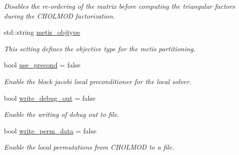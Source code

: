 \begin{DoxyCompactItemize}
\begin{DoxyCompactList}\small\item\em Disables the re-\/ordering of the matrix before computing the triangular factors during the C\+H\+O\+L\+M\+OD factorization. \end{DoxyCompactList}\item 
\mbox{\label{structSchwarzWrappers_1_1Settings_abbfee6b651293973f478e70ae656d6d0}} 
std\+::string \hyperlink{structSchwarzWrappers_1_1Settings_abbfee6b651293973f478e70ae656d6d0}{metis\+\_\+objtype}
\begin{DoxyCompactList}\small\item\em This setting defines the objective type for the metis partitioning. \end{DoxyCompactList}\item 
\mbox{\label{structSchwarzWrappers_1_1Settings_a91f3a3c6eb903baace2d424285777cb8}} 
bool \hyperlink{structSchwarzWrappers_1_1Settings_a91f3a3c6eb903baace2d424285777cb8}{use\+\_\+precond} = false
\begin{DoxyCompactList}\small\item\em Enable the block jacobi local preconditioner for the local solver. \end{DoxyCompactList}\item 
\mbox{\label{structSchwarzWrappers_1_1Settings_a22d2c317d86d5388178b5003bcc52b98}} 
bool \hyperlink{structSchwarzWrappers_1_1Settings_a22d2c317d86d5388178b5003bcc52b98}{write\+\_\+debug\+\_\+out} = false
\begin{DoxyCompactList}\small\item\em Enable the writing of debug out to file. \end{DoxyCompactList}\item 
\mbox{\label{structSchwarzWrappers_1_1Settings_a04ee69460b8c946710ef15af70f086b4}} 
bool \hyperlink{structSchwarzWrappers_1_1Settings_a04ee69460b8c946710ef15af70f086b4}{write\+\_\+perm\+\_\+data} = false
\begin{DoxyCompactList}\small\item\em Enable the local permutations from C\+H\+O\+L\+M\+OD to a file. \end{DoxyCompactList}\item 

\end{DoxyCompactItemize}
